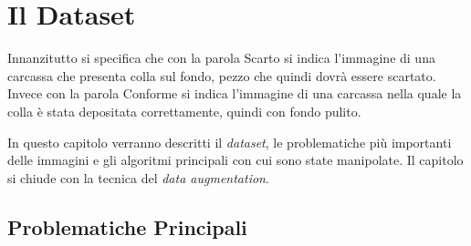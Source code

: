 
\chapter{Il Dataset}

Innanzitutto si specifica che con la parola Scarto si indica l'immagine di una carcassa che presenta colla sul fondo, pezzo che quindi dovrà essere scartato.
Invece con la parola Conforme si indica l'immagine di una carcassa nella quale la colla è stata depositata correttamente, quindi con fondo pulito.

In questo capitolo verranno descritti il \textit{dataset}, le problematiche più importanti delle immagini e gli algoritmi principali con cui sono state manipolate.
Il capitolo si chiude con la tecnica del \textit{data augmentation}.

\section{Problematiche Principali}

